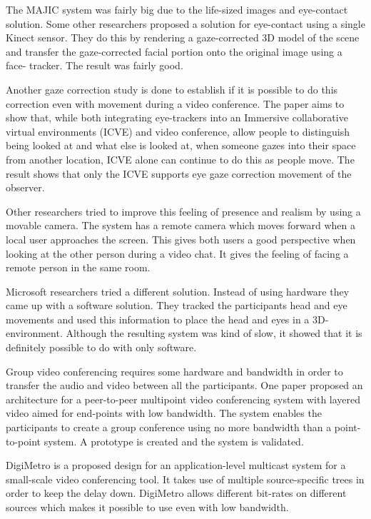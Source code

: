 \documentclass[12pt, titlepage]{article}
\begin{document}
The MAJIC system was fairly big due to the life-sized images and eye-contact solution. Some other researchers proposed a solution for eye-contact using a single Kinect sensor\cite{21}. They do this by rendering a gaze-corrected 3D model of the scene and transfer the gaze-corrected facial portion onto the original image using a face- tracker. The result was fairly good.

Another gaze correction study is done to establish if it is possible to do this correction even with movement during a video conference\cite{20}. The paper aims to show that, while both integrating eye-trackers into an Immersive collaborative virtual
environments (ICVE) and video conference, allow people to distinguish being looked at and what else is looked at, when someone gazes into their space from another location, ICVE alone can continue to do this as people move. The result shows that only the ICVE supports eye gaze correction movement of the observer.

Other researchers tried to improve this feeling of presence and realism by using a movable camera\cite{19}. The system has a remote camera which moves forward when a local user approaches the screen. This gives both users a good perspective when looking at the other person during a video chat. It gives the feeling of facing a remote person in the same room.

Microsoft researchers tried a different solution. Instead of using hardware they came up with a software solution\cite{22}. They tracked the participants head and eye movements and used this information to place the head and eyes in a 3D-environment. Although the resulting system was kind of slow, it showed that it is definitely possible to do with only software.

Group video conferencing requires some hardware and bandwidth in order to transfer the audio and video between all the participants.
One paper proposed an architecture for a peer-to-peer multipoint video conferencing system with layered video aimed for end-points with low bandwidth\cite{14}. The system enables the participants to create a group conference using no more bandwidth than a point-to-point system. A prototype is created and the system is validated.

DigiMetro\cite{16} is a proposed design for an application-level multicast system for a small-scale video conferencing tool. It takes use of multiple source-specific trees in order to keep the delay down. DigiMetro allows different bit-rates on different sources which makes it possible to use even with low bandwidth.
\end{document}
